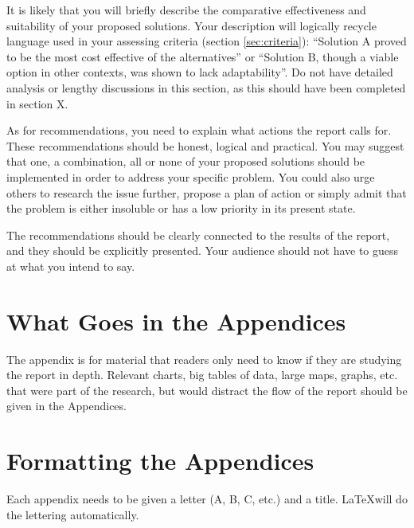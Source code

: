\documentclass[conference]{IEEEtran}
\begin{document}
It is likely that you will briefly describe the comparative effectiveness and suitability of your proposed solutions. Your description will logically recycle language used in your assessing criteria (section \ref{sec:criteria}): ``Solution A proved to be the most cost effective of the alternatives'' or ``Solution B, though a viable option in other contexts, was shown to lack adaptability''.  Do not have detailed analysis or lengthy discussions in this section, as this should have been completed in section X. 
 
As for recommendations, you need to explain what actions the report calls for. These recommendations should be honest, logical and practical. You may suggest that one, a combination, all or none of your proposed solutions should be implemented in order to address your specific problem. You could also urge others to research the issue further, propose a plan of action or simply admit that the problem is either insoluble or has a low priority in its present state.   

The recommendations should be clearly connected to the results of the report, and they should be explicitly presented. Your audience should not have to guess at what you intend to say.  




\appendices
\section{What Goes in the Appendices} \label{App:WhatGoes}
The appendix is for material that readers only need to know if they are studying the report in depth. Relevant charts, big tables of data, large maps, graphs, etc. that were part of the research, but would distract the flow of the report should be given in the Appendices. 
\section{Formatting the Appendices} \label{App:Formatting}
Each appendix needs to be given a letter (A, B, C, etc.) and a title. \LaTeX will do the lettering automatically.
\end{document}

